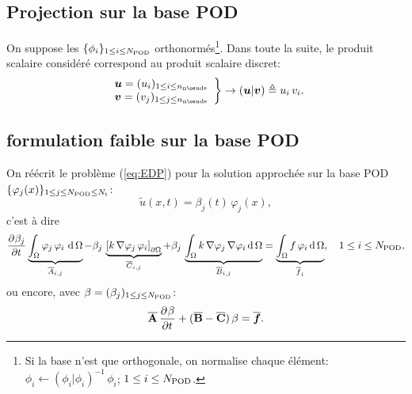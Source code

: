 \documentclass[11pt,a4paper]{article}
\newcommand{\nnodes}{{n_{\labelname{nœuds}}}}
\begin{document}
\subsection{Projection sur la base POD}

On suppose les $\{\phi_i\}_{1\leq i \leq N_{\mathrm{POD}}}$ orthonormés\footnote{Si la base n'est que orthogonale, on normalise chaque élément: $\phi_i\leftarrow (\phi_i \vert \phi_i)^{-1}\,\phi_i$; $1\leq i\leq N_{\mathrm{POD}}$.}.
%
Dans toute la suite, le produit scalaire considéré correspond au produit scalaire discret:
%
\begin{equation}
\label{eq:produit_scalaire_discret}
\left.
\begin{array}{l}
\vec{u} = (u_i)_{1 \leq i \leq \nnodes}\\
\vec{v} = (v_j)_{1 \leq j \leq \nnodes}
\end{array}
\right\}
\rightarrow
(\vec u \vert \vec v) \triangleq u_i\,v_i.
\end{equation}
%
%
\subsection{formulation faible sur la base POD}
On réécrit le problème (\ref{eq:EDP}) pour la solution approchée sur la base POD $\{\varphi_j(x)\}_{1\leq j \leq N_{\mathrm{POD}}\leq N_{\mathrm{t}}}$:
$$\tilde u(x,t) = \beta_j(t)\,\varphi_j(x), $$
c'est à dire
 $$\frac{\partial^{} \beta_j}{\partial t^{}} \underbrace{\int_\Omega\varphi_j\, \varphi_i\,\operatorname{d} \Omega}_{\overline{A}_{i,j}} -\beta_j\, \underbrace{\left[k \,\nabla \varphi_j\,\varphi_i \right]_{\partial\Omega}}_{\overline{C}_{i,j}} + \beta_j\,\underbrace{\int_\Omega k\,\nabla  \varphi_j\, \nabla \varphi_i \operatorname{d} \Omega}_{\overline{B}_{i,j}}= \underbrace{\int_\Omega f\, \varphi_i \operatorname{d} \Omega}_{\overline{f}_i},\quad 1\leq i \leq N_{\mathrm{POD}}, $$
ou encore, avec $\beta=(\beta_j)_{1\leq j\leq N_{\mathrm{POD}}}$:
$$\overline{\mathbf{A}}\,\frac{\partial^{} \beta}{\partial t^{}} + (\overline{\mathbf{B}}-\overline{\mathbf{C}})\,\beta = \boldsymbol{\overline{f}}.$$


\end{document}
